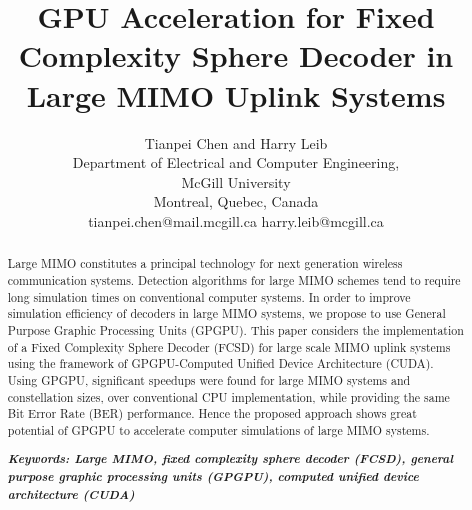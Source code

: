 \documentclass[letterpaper, 10pt, conference, twoside]{ieeeconf}
\title{\LARGE \bf GPU Acceleration for Fixed Complexity Sphere Decoder in Large MIMO Uplink Systems}
\author{Tianpei Chen and Harry Leib\\
Department of Electrical and Computer Engineering,\\
 McGill University\\ Montreal, Quebec, Canada\\
tianpei.chen@mail.mcgill.ca harry.leib@mcgill.ca}
\begin{document}
\maketitle
\begin{abstract}
Large MIMO constitutes a principal technology for next generation wireless communication systems. Detection algorithms for large MIMO schemes tend to require long simulation times on conventional computer systems. In order to improve simulation efficiency of decoders in large MIMO systems, we propose to use General Purpose Graphic Processing Units (GPGPU). This paper considers the implementation of a Fixed Complexity Sphere Decoder (FCSD) for large scale MIMO uplink systems using the framework of GPGPU-Computed Unified Device Architecture (CUDA). Using GPGPU, significant speedups were found for large MIMO systems and constellation sizes, over conventional CPU implementation, while providing the same Bit Error Rate (BER) performance. Hence the proposed approach shows great potential of GPGPU to accelerate computer simulations of large MIMO systems.

\textbf{ \textit{ Keywords: Large MIMO, fixed complexity sphere decoder (FCSD), general purpose graphic processing units (GPGPU), computed unified device architecture (CUDA)}}
\end{abstract}





%
\end{document}
